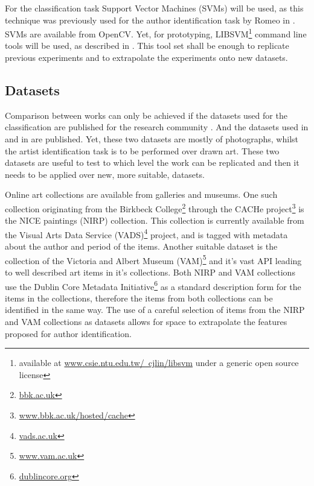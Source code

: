 \documentclass[a4paper]{article}
\begin{document}
For the classification task Support Vector Machines (SVMs) will be used, as
this technique was previously used for the author identification task by Romeo
in \cite{rmc12ajs}.  SVMs are available from OpenCV.  Yet, for prototyping,
LIBSVM\footnote{available at \href{http://www.csie.ntu.edu.tw/~cjlin/libsvm/}
{www.csie.ntu.edu.tw/~cjlin/libsvm} under a generic open source license}
command line tools will be used, as described in \cite{hcl03svm}.  This tool
set shall be enough to replicate previous experiments and to extrapolate the
experiments onto new datasets.

\subsection{Datasets}

Comparison between works can only be achieved if the datasets used for the
classification are published for the research community \cite{mach10clas}.  And
the datasets used in \cite{mach10clas} and in \cite{jma12clas} are published.
Yet, these two datasets are mostly of photographs, whilst the artist
identification task is to be performed over drawn art.  These two datasets are
useful to test to which level the work can be replicated and then it needs to
be applied over new, more suitable, datasets.

Online art collections are available from galleries and museums.  One such
collection originating from the Birkbeck College\footnote{
\href{http://www.bbk.ac.uk}{bbk.ac.uk}} through the CACHe project\footnote{
\href{http://www.bbk.ac.uk/hosted/cache/}{www.bbk.ac.uk/hosted/cache}} is the
NICE paintings (NIRP) collection.  This collection is currently available from
the Visual Arts Data Service (VADS)\footnote{
\href{http://vads.ac.uk/}{vads.ac.uk}} project, and is tagged with metadata
about the author and period of the items.  Another suitable dataset is the
collection of the Victoria and Albert Museum (VAM)\footnote{
\href{http://www.vam.ac.uk/}{www.vam.ac.uk}} and it's vast API leading to well
described art items in it's collections.  Both NIRP and VAM collections use the
Dublin Core Metadata Initiative\footnote{
\href{http://dublincore.org/}{dublincore.org}} as a standard description form
for the items in the collections, therefore the items from both collections can
be identified in the same way.  The use of a careful selection of items from
the NIRP and VAM collections as datasets allows for space to extrapolate the
features proposed for author identification.
\end{document}
